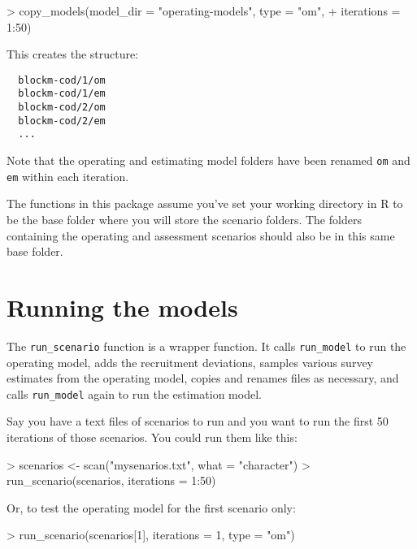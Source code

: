 \documentclass[12pt]{article}
\begin{document}
\begin{Schunk}
\begin{Sinput}
> copy_models(model_dir = "operating-models", type = "om", 
+   iterations = 1:50)
\end{Sinput}
\end{Schunk}

\noindent
This creates the structure:

\begin{verbatim}
  blockm-cod/1/om
  blockm-cod/1/em
  blockm-cod/2/om
  blockm-cod/2/em
  ...
\end{verbatim}

\noindent
Note that the operating and estimating model folders have been renamed
\texttt{om} and \texttt{em} within each iteration.

The functions in this package assume you've set your working directory
in R to be the base folder where you will store the scenario folders. The
folders containing the operating and assessment scenarios should also be in this
same base folder.

\section*{Running the models}

The \texttt{run\_scenario} function is a wrapper function. It calls
\texttt{run\_model} to run the operating model, adds the recruitment deviations,
samples various survey estimates from the operating model, copies and renames
files as necessary, and calls \texttt{run\_model} again to run the estimation
model.

Say you have a text files of scenarios to run and you want to run the first 50
iterations of those scenarios. You could run them like this:

\begin{Schunk}
\begin{Sinput}
> scenarios <- scan("mysenarios.txt", what = "character")
> run_scenario(scenarios, iterations = 1:50)
\end{Sinput}
\end{Schunk}

\noindent
Or, to test the operating model for the first scenario only:

\begin{Schunk}
\begin{Sinput}
> run_scenario(scenarios[1], iterations = 1, type = "om")
\end{Sinput}
\end{Schunk}
\end{document}
